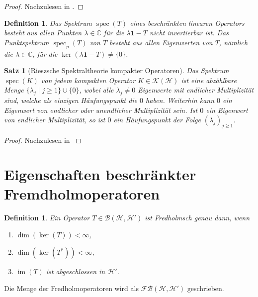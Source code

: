 \documentclass[11pt, hidelinks]{article}
\newcommand{\h}{\mathcal{H}}
\newcommand{\spec}{\operatorname{spec}}
\newcommand{\im}{\operatorname{im}}
\numberwithin{conj}{section}
\newtheorem{definition}[conj]{Definition}
\newtheorem{theorem}[conj]{Satz}
\begin{document}
\begin{proof}
Nachzulesen in \cite[Satz VI.2.1, Lemma VI.2.2]{werner2018funktionalanalysis}.
\end{proof}

\begin{definition}
    Das Spektrum $\spec(T)$ eines beschränkten linearen Operators besteht aus allen Punkten $\lambda \in \mathbb{C}$ für die $\lambda \mathbf{1} - T$ nicht invertierbar ist. Das Punktspektrum $\spec_p(T)$ von $T$ besteht aus allen Eigenwerten von $T$, nämlich die $\lambda \in \mathbb{C}$, für die $\ker(\lambda \mathbf{1} - T) \neq \{0\}$.
\end{definition}

\begin{theorem}[Rieszsche Spektraltheorie kompakter Operatoren]
\label{Riesz}
Das Spektrum $\spec(K)$ von jedem kompakten Operator $K \in \mathcal{K}(\h)$ ist eine abzählbare Menge $\{\lambda_j \; \vert \; j \geq 1\} \cup \{0\}$, wobei alle $\lambda_j \neq 0$ Eigenwerte mit endlicher Multiplizität sind, welche als einzigen Häufungspunkt die $0$ haben. Weiterhin kann $0$ ein Eigenwert von endlicher oder unendlicher Multiplizität sein. Ist $0$ ein Eigenwert von endlicher Multiplizität, so ist $0$ ein Häufungspunkt der Folge $(\lambda_j)_{j \geq 1}$.
\end{theorem}

\begin{proof}
Nachzulesen in \cite[VI.2.5]{werner2018funktionalanalysis}
\end{proof}

\section{Eigenschaften beschränkter Fremdholmoperatoren}
\begin{definition}
    Ein Operator $T \in \mathcal{B}(\h,\h')$ ist Fredholmsch genau dann, wenn
    \begin{enumerate}
        \item $\dim(\ker(T)) < \infty$,
        \item $\dim(\ker(T^\ast)) < \infty$,
        \item $\im(T)$ ist abgeschlossen in $\h'$.
    \end{enumerate}
\end{definition}

Die Menge der Fredholmoperatoren wird als $\mathcal{FB}(\h,\h')$ geschrieben.
\end{document}
